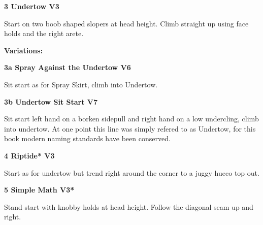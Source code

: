 \begin{multicols}{2}
\needspace{1.5cm}
\label{rt:Undertow}
\colorbox{green!20}{
\parbox{0.95\linewidth}{
\textbf{
3 Undertow V3  
}}}

\begin{adjustwidth}{0.5cm}{}			
Start on two boob shaped slopers at head height. Climb straight up using face holds and the right arete.
\end{adjustwidth}

\begin{adjustwidth}{0.5cm}{}				
\needspace{3cm}
\textbf{Variations:} \newline

\needspace{1.5cm}
\label{vr:Spray Against the Undertow}
\colorbox{RoyalBlue!20}{
\parbox{0.95\linewidth}{
\textbf{
3a Spray Against the Undertow V6  
}}}

\begin{adjustwidth}{0.5cm}{}			
Sit start as for Spray Skirt, climb into Undertow.
\end{adjustwidth}



\needspace{1.5cm}
\label{vr:Undertow Sit Start}
\colorbox{Goldenrod!50}{
\parbox{0.95\linewidth}{
\textbf{
3b Undertow Sit Start V7  
}}}

\begin{adjustwidth}{0.5cm}{}			
Sit start left hand on a borken sidepull and right hand on a low undercling, climb into undertow. At one point this line was simply refered to as Undertow, for this book modern naming standards have been conserved.
\end{adjustwidth}


\end{adjustwidth}


\needspace{1.5cm}
\label{rt:Riptide}
\colorbox{green!20}{
\parbox{0.95\linewidth}{
\textbf{
4 Riptide* V3  
}}}

\begin{adjustwidth}{0.5cm}{}			
Start as for undertow but trend right around the corner to a juggy hueco top out.
\end{adjustwidth}



\needspace{1.5cm}
\label{rt:Simple Math}
\colorbox{green!20}{
\parbox{0.95\linewidth}{
\textbf{
5 Simple Math V3*  
}}}

\begin{adjustwidth}{0.5cm}{}			
Stand start with knobby holds at head height. Follow the diagonal seam up and right.
\end{adjustwidth}


\end{multicols}
